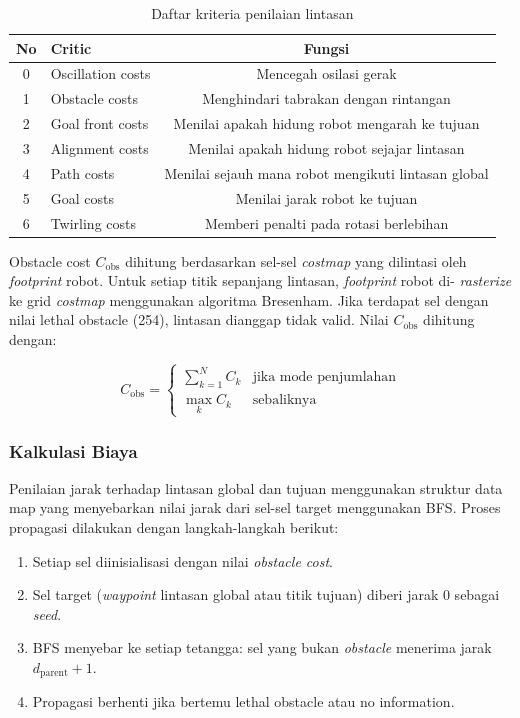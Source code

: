 \begin{table}[H]
\centering
\caption{Daftar kriteria penilaian lintasan}
\label{tab:dwa_critics}
\begin{tabular}{clc}
\toprule
\textbf{No} & \textbf{Critic} & \textbf{Fungsi} \\
\midrule
0 & Oscillation costs  & Mencegah osilasi gerak \\
1 & Obstacle costs     & Menghindari tabrakan dengan rintangan \\
2 & Goal front costs   & Menilai apakah hidung robot mengarah ke tujuan \\
3 & Alignment costs    & Menilai apakah hidung robot sejajar lintasan \\
4 & Path costs         & Menilai sejauh mana robot mengikuti lintasan global \\
5 & Goal costs         & Menilai jarak robot ke tujuan \\
6 & Twirling costs     & Memberi penalti pada rotasi berlebihan \\
\bottomrule
\end{tabular}
\end{table}

Obstacle cost $C_{\text{obs}}$ dihitung berdasarkan sel-sel
\emph{costmap} yang dilintasi oleh \emph{footprint} robot. Untuk
setiap titik sepanjang lintasan, \emph{footprint} robot di-
\emph{rasterize} ke grid \emph{costmap} menggunakan algoritma
Bresenham. Jika terdapat sel dengan nilai lethal obstacle
(254), lintasan dianggap tidak valid. Nilai $C_{\text{obs}}$
dihitung dengan:

\begin{equation}
C_{\text{obs}} = \begin{cases}
\displaystyle\sum_{k=1}^{N} C_k & \text{jika mode penjumlahan} \\[6pt]
\max_k C_k & \text{sebaliknya}
\end{cases}
\end{equation}

\subsubsection{Kalkulasi Biaya}

Penilaian jarak terhadap lintasan global dan tujuan menggunakan
struktur data map yang menyebarkan nilai jarak dari
sel-sel target menggunakan BFS. Proses propagasi dilakukan dengan
langkah-langkah berikut:

\begin{enumerate}
  \item Setiap sel diinisialisasi dengan nilai \emph{obstacle cost}.
  \item Sel target (\emph{waypoint} lintasan global atau titik
  tujuan) diberi jarak 0 sebagai \emph{seed}.
  \item BFS menyebar ke setiap tetangga: sel yang bukan \emph{obstacle}
  menerima jarak $d_{\text{parent}} + 1$.
  \item Propagasi berhenti jika bertemu lethal obstacle atau
  no information.
\end{enumerate}

